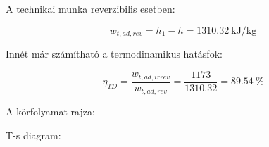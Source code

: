 \noindent A technikai munka reverzibilis esetben:

\begin{equation}
	w_{t,ad,rev} = h_1- h = \SI{1310.32}{\kilo\joule\per\kilogram}
\end{equation}

\noindent Innét már számítható a termodinamikus hatásfok:

\begin{equation}
	\eta_{TD} = \dfrac {w_{t,ad,irrev}}{w_{t,ad,rev}} = \dfrac {1173}{1310.32} = \SI{89.54}{\percent}
\end{equation}

\noindent A körfolyamat rajza:

\noindent T-s diagram:

\pagebreak